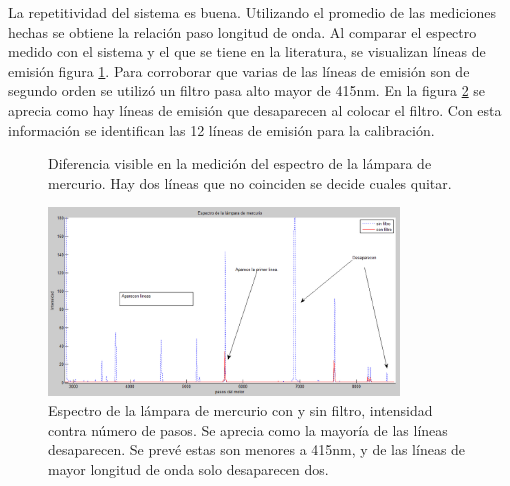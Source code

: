 La repetitividad del sistema es buena. Utilizando el promedio de las mediciones hechas se obtiene la relación paso longitud de onda. Al comparar el espectro medido con el sistema y el que se tiene en la literatura, se visualizan líneas de emisión  figura \ref{fig:espectroCompa}.
Para corroborar que varias de las líneas de emisión son de segundo orden se utilizó un filtro pasa alto mayor de 415nm. En la figura \ref{fig:hgfiltro} se aprecia como hay líneas de emisión que desaparecen al colocar el filtro. Con esta información se identifican las 12 líneas de emisión para la calibración.
\begin{figure}[h]
	\centering
	\caption{Diferencia visible en la medición del espectro de la lámpara de mercurio. Hay dos líneas que no coinciden se decide cuales quitar.}
	\label{fig:espectroCompa}
\end{figure}
\begin{figure}[h]
	\centering
	\includegraphics[width=0.75\linewidth, height=5cm]{Imagenes/3/HgFiltro}
	\caption[Espectro de la lámpara de mercurio con y sin filtro, intensidad contra pasos.]{Espectro de la lámpara de mercurio con y sin filtro, intensidad contra número de pasos. Se aprecia como la mayoría de las líneas desaparecen. Se prevé estas son menores a 415nm, y de las líneas de mayor longitud de onda solo desaparecen dos.}
	\label{fig:hgfiltro}
\end{figure}


